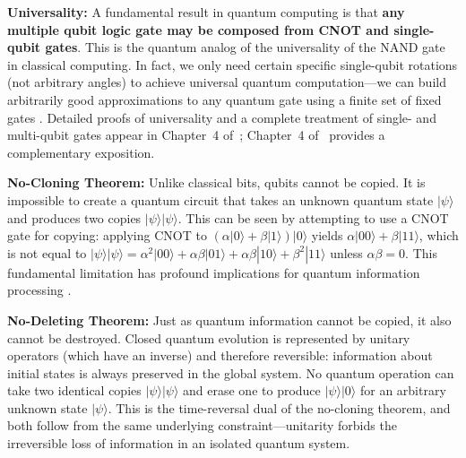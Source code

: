 \documentclass[a4paper,12pt]{amsart}
\begin{document}
\textbf{Universality:} A fundamental result in quantum computing is that \textbf{any multiple qubit logic gate may be composed from CNOT and single-qubit gates}. This is the quantum analog of the universality of the NAND gate in classical computing. In fact, we only need certain specific single-qubit rotations (not arbitrary angles) to achieve universal quantum computation—we can build arbitrarily good approximations to any quantum gate using a finite set of fixed gates \cite{nielsen2011quantum}. Detailed proofs of universality and a complete treatment of single- and multi-qubit gates appear in Chapter~4 of~\cite{nielsen2011quantum}; Chapter~4 of~\cite{yanofsky2008quantum} provides a complementary exposition.

\textbf{No-Cloning Theorem:} Unlike classical bits, qubits cannot be copied. It is impossible to create a quantum circuit that takes an unknown quantum state $|\psi\rangle$ and produces two copies $|\psi\rangle|\psi\rangle$. This can be seen by attempting to use a CNOT gate for copying: applying CNOT to $(\alpha|0\rangle + \beta|1\rangle)|0\rangle$ yields $\alpha|00\rangle + \beta|11\rangle$, which is not equal to $|\psi\rangle|\psi\rangle = \alpha^2|00\rangle + \alpha\beta|01\rangle + \alpha\beta|10\rangle + \beta^2|11\rangle$ unless $\alpha\beta = 0$. This fundamental limitation has profound implications for quantum information processing \cite{nielsen2011quantum, yanofsky2008quantum}.

\textbf{No-Deleting Theorem:} Just as quantum information cannot be copied, it also cannot be destroyed. Closed quantum evolution is represented by unitary operators (which have an inverse) and therefore reversible: information about initial states is always preserved in the global system. No quantum operation can take two identical copies $|\psi\rangle|\psi\rangle$ and erase one to produce $|\psi\rangle|0\rangle$ for an arbitrary unknown state $|\psi\rangle$. This is the time-reversal dual of the no-cloning theorem, and both follow from the same underlying constraint—unitarity forbids the irreversible loss of information in an isolated quantum system.
\end{document}
